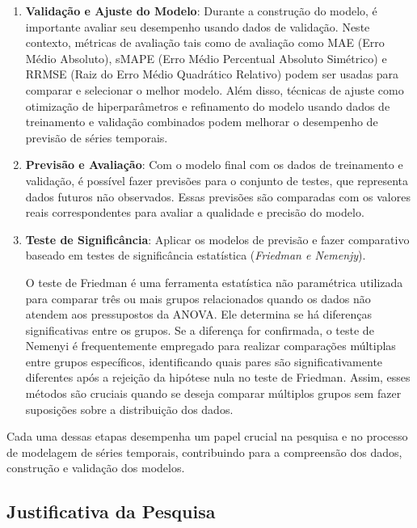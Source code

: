 \begin{enumerate}[start=1, label={\textbf{Etapa} \arabic*}]
	\item \label{etp:6} \textbf{Validação e Ajuste do Modelo}: Durante a construção do modelo, é importante avaliar seu desempenho usando dados de validação. Neste contexto, métricas de avaliação tais como de avaliação como MAE (Erro Médio Absoluto), sMAPE (Erro Médio Percentual Absoluto Simétrico) e RRMSE (Raiz do Erro Médio Quadrático Relativo) podem ser usadas para comparar e selecionar o melhor modelo. Além disso, técnicas de ajuste como otimização de hiperparâmetros e refinamento do modelo usando dados de treinamento e validação combinados podem melhorar o desempenho de previsão de séries temporais.
	
	\item \label{etp:7} \textbf{Previsão e Avaliação}: Com o modelo final com os dados de treinamento e validação, é possível fazer previsões para o conjunto de testes, que representa dados futuros não observados. Essas previsões são comparadas com os valores reais correspondentes para avaliar a qualidade e precisão do modelo.
	
	\item \label{etp:8} \textbf{Teste de Significância}: Aplicar os modelos de previsão e fazer comparativo baseado em testes de significância estatística (\textit{Friedman e Nemenjy}).
	
	O teste de Friedman é uma ferramenta estatística não paramétrica utilizada para comparar três ou mais grupos relacionados quando os dados não atendem aos pressupostos da ANOVA. Ele determina se há diferenças significativas entre os grupos. Se a diferença for confirmada, o teste de Nemenyi é frequentemente empregado para realizar comparações múltiplas entre grupos específicos, identificando quais pares são significativamente diferentes após a rejeição da hipótese nula no teste de Friedman. Assim, esses métodos são cruciais quando se deseja comparar múltiplos grupos sem fazer suposições sobre a distribuição dos dados.
	
	
\end{enumerate}

Cada uma dessas etapas desempenha um papel crucial na pesquisa e no processo de modelagem de séries temporais, contribuindo para a compreensão dos dados, construção e validação dos modelos.


\subsection{Justificativa da Pesquisa} \label{subsec:justif}

